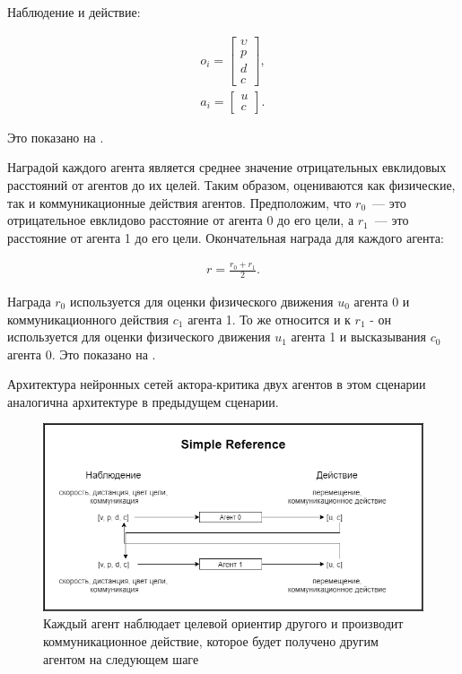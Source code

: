 Наблюдение и действие:

\begin{equation}
    \begin{multlined}
        o_i = \begin{bmatrix}
                  \upsilon \\ p \\ d \\ c
        \end{bmatrix}, \\
        a_i = \begin{bmatrix}
                  u \\ c
        \end{bmatrix}.
    \end{multlined}
\end{equation}


Это показано на .

Наградой каждого агента является среднее значение отрицательных евклидовых расстояний от агентов до их целей. Таким образом, оцениваются как физические, так и коммуникационные действия агентов. Предположим, что $r_0$~--- это отрицательное евклидово расстояние от агента 0 до его цели, а $r_1$~--- это расстояние от агента 1 до его цели. Окончательная награда для каждого агента:

\begin{equation}
    \begin{multlined}
        r = \frac{r_0 + r_1}{2}.
    \end{multlined}
\end{equation}

Награда $r_0$ используется для оценки физического движения $u_0$ агента 0 и коммуникационного действия $c_1$ агента 1. То же относится и к $r_1$ - он используется для оценки физического движения $u_1$ агента 1 и высказывания $c_0$ агента 0. Это показано на .

Архитектура нейронных сетей актора-критика двух агентов в этом сценарии аналогична архитектуре в предыдущем сценарии.

\begin{figure}[ht!]
    \center
    \includegraphics [scale=0.60] {my_folder/images/ch4/simple_reference.png}
    \caption{Каждый агент наблюдает целевой ориентир другого и производит коммуникационное действие, которое будет получено другим агентом на следующем шаге}
    \label{fig:exp-sr}
\end{figure}

